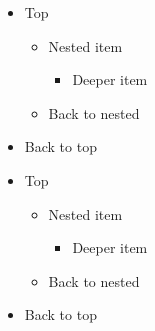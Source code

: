 \begin{frame}[t]
\begin{itemize}
\item Top
\begin{itemize}
\item Nested item
\begin{itemize}
\item Deeper item
\end{itemize}
\item Back to nested
\end{itemize}
\item Back to top
\end{itemize}
\end{frame}

\begin{frame}[t]
\begin{itemize}
\item Top
\begin{itemize}
\item Nested item
\begin{itemize}
\item Deeper item
\end{itemize}
\item Back to nested
\end{itemize}
\item Back to top
\end{itemize}
\end{frame}

